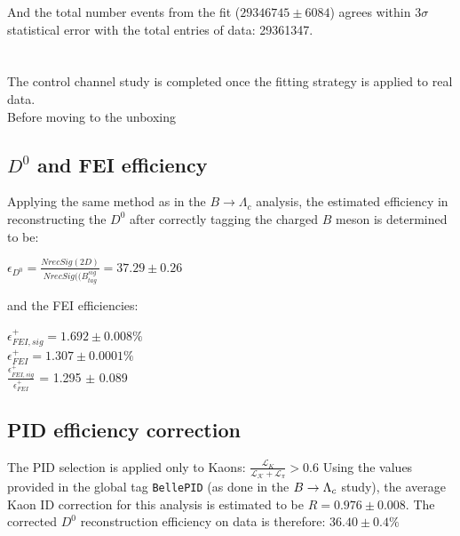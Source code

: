 \vspace{0.5 cm}
\noindent And the total number events from the fit ($29346745 \pm 6084$) agrees within $3\sigma$ statistical error with the total
entries of data: 29361347.



\section{}
The control channel study is completed once the fitting strategy is applied to real data.\\
Before moving to the unboxing 

\subsection{$D^0$ and FEI efficiency}\label{sec:ControlRecoEff}

Applying the same method as in the $B \rightarrow \Lambda_c$  analysis, the estimated efficiency in reconstructing the $D^0$ after correctly tagging the charged $B$ meson is
determined to be:

$\epsilon_{D^0} = \frac{NrecSig(2D) }{NrecSig((B_{tag}^{sig}} = 37.29 \pm 0.26$

and the FEI efficiencies:

$\epsilon^+_{FEI,sig} = 1.692 \pm 0.008\%$ \\
$\epsilon^+_{FEI} = 1.307 \pm 0.0001\%$\\
$\frac{\epsilon^+_{FEI,sig}}{\epsilon^+_{FEI}}$ = 1.295 $\pm $ 0.089\\



\subsection{PID efficiency correction}\label{sec:ControlPIDeff}
The PID selection is applied only to Kaons: $\frac{\mathcal{L}_{K}}{\mathcal{L_{K}}+\mathcal{L_{\pi}}} > 0.6$ 
Using the values provided in the global tag \texttt{BellePID} (as done in the $B \rightarrow \Lambda_c$ study), the average Kaon ID correction for this analysis is estimated to be 
$R = 0.976 \pm 0.008$.
\vspace{0.2 cm}
The corrected $D^0$ reconstruction efficiency on data is therefore: $36.40 \pm 0.4 \%$
